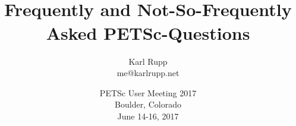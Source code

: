 \documentclass[usepdftitle=false,9pt]{beamer}
\author[Karl Rupp]{Karl Rupp \\ \ttfamily me@karlrupp.net}
\institute[Freelance]
{ \footnotesize
  Freelance Computational Scientist \\
  \textit{and} \\
  Institute for Microelectronics, TU Wien \\[1em]
}
\title[PETSc]{ \vspace*{1cm}\\ {Frequently and Not-So-Frequently Asked PETSc-Questions } %
             }
\date[PETSc 2017, June 14-16, 2017]{ \footnotesize PETSc User Meeting 2017 \\[1em] Boulder, Colorado \\[1em] June 14-16, 2017}
\begin{document}
\begin{frame}[plain]
 \frametitle{~}
 \titlepage
\end{frame}


\end{document}
